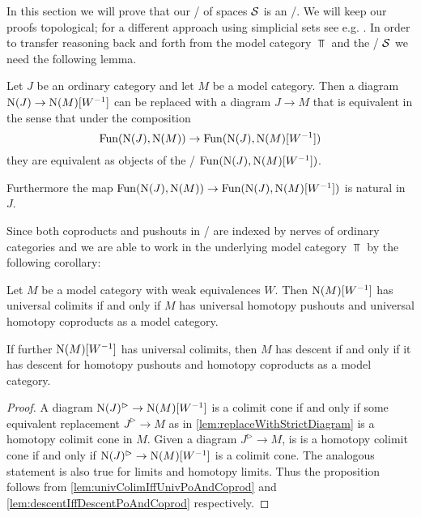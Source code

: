 In this section we will prove that our \inftycat/ of spaces $\mathcal{S}$ is an \inftytop/.
We will keep our proofs topological; for a different approach using simplicial sets see e.g. \cite[\S 6]{HTT}.
In order to transfer reasoning back and forth from the model category $\Top$ and the \inftycat/ $\mathcal{S}$ we need the following lemma.
\begin{lemma}\label{lem:replaceWithStrictDiagram} %
    Let $J$ be an ordinary category and let $M$ be a model category.
    Then a diagram $\operatorname{N}(J)\to\operatorname{N}(M)[W^{-1}]$ can be replaced with a diagram $J\to M$ that is equivalent in the sense that under the composition
    \begin{equation*}
        \Fun(\N(J),\N(M))\to\Fun(\N(J),\N(M)[W^{-1}]) %
    \end{equation*} 
    they are equivalent as objects of the \inftycat/ $\operatorname{Fun}(\operatorname{N}(J),\operatorname{N}(M)[W^{-1}])$.

    Furthermore the map $\operatorname{Fun}(\operatorname{N}(J),\operatorname{N}(M))\to\operatorname{Fun}(\operatorname{N}(J),\operatorname{N}(M)[W^{-1}])$ is natural in $J$.
    \begin{reference}
        \cite[Proposition 1.3.4.25]{higher_algebra}
    \end{reference}
\end{lemma}
Since both coproducts and pushouts in \inftycats/ are indexed by nerves of ordinary categories and we are able to work in the underlying model category $\Top$ by the following corollary:
\begin{corollary}\label{cor:sufficientToProveInModCat}
    Let $M$ be a model category with weak equivalences $W$. 
    Then $\operatorname{N}(M)[W^{-1}]$ has universal colimits if and only if $M$ has universal homotopy pushouts and universal homotopy coproducts as a model category.
    
    If further $\operatorname{N}(M)[W^{-1}]$ has universal colimits, then $M$ has descent if and only if it has descent for homotopy pushouts and homotopy coproducts as a model category.
    \begin{proof}
        A diagram $\operatorname{N}(J)^{\rhd}\to\operatorname{N}(M)[W^{-1}]$ is a colimit cone if and only if some equivalent replacement $J^{\rhd}\to M$ as in \cref{lem:replaceWithStrictDiagram} is a homotopy colimit cone in $M$.
        Given a diagram $J^{\rhd}\to M$, is is a homotopy colimit cone if and only if $\operatorname{N}(J)^{\rhd}\to\operatorname{N}(M)[W^{-1}]$ is a colimit cone.
        The analogous statement is also true for limits and homotopy limits.
        Thus the proposition follows from \cref{lem:univColimIffUnivPoAndCoprod} and \cref{lem:descentIffDescentPoAndCoprod} respectively.
    \end{proof}
\end{corollary}
